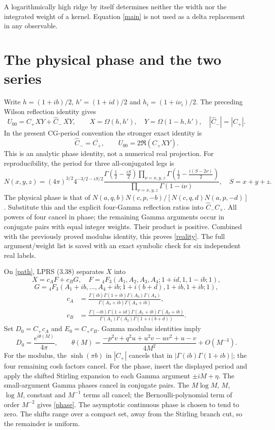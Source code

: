 \documentclass[11pt,a4paper]{article}
\newcommand{\Om}{\Omega}
\begin{document}
A logarithmically high ridge by itself determines neither the width
nor the integrated weight of a kernel. Equation \eqref{main} is not
used as a delta replacement in any observable.

\newpage
\section{The physical phase and the two series}
Write $h=(1+ib)/2$, $h'=(1+id)/2$ and $h_i=(1+i\nu_i)/2$.
The preceding Wilson reflection identity gives
\[
 U_{00}=C_+XY+\widehat C_-\,\overline{XY},\qquad
 X=\Om(h,h'),\quad Y=\Om(1-h,h'),\quad |\widehat C_-|=|C_+|.
\]
In the present CG-period convention the stronger exact identity is
\begin{equation}
 \widehat C_-=\overline{C_+},\qquad U_{00}=2\Re(C_+XY).
 \label{reality}
\end{equation}
This is an analytic phase identity, not a numerical real projection.
For reproducibility, the period for three all-conjugated legs is
\[
 N(x,y,z)=(4\pi)^{3/2}4^{-3/2-iS/2}
 \frac{\Gamma(\frac12-\frac{iS}{2})
       \prod_{\nu=x,y,z}\Gamma(\frac12-\frac{i(S-2\nu)}2)}
      {\prod_{\nu=x,y,z}\Gamma(1-i\nu)},\quad S=x+y+z .
\]
The physical phase is that of
$N(a,q,b)N(c,p,-b)/[N(c,q,d)N(a,p,-d)]$.
Substitute this and the explicit four-Gamma reflection ratios into
$\widehat C_-C_+$. All powers of four cancel in phase; the remaining
Gamma arguments occur in conjugate pairs with equal integer weights.
Their product is positive. Combined with the previously proved modulus
identity, this proves \eqref{reality}. The full argument/weight list is
saved with an exact symbolic check for six independent real labels.

On \eqref{path}, LPRS (3.38) separates $X$ into
\[
 X=c_A F+c_B G,\quad
 F={}_4F_3(A_1,A_2,A_3,A_4;1+id,1,1-ib;1),
\]
\[
 G={}_4F_3(A_1+ib,\ldots,A_4+ib;
                  1+i(b+d),1+ib,1+ib;1),
\]
\begin{align*}
 c_A&=\frac{\Gamma(ib)\Gamma(1+ib)\Gamma(A_3)\Gamma(A_4)}
              {\Gamma(A_3+ib)\Gamma(A_4+ib)},\\
 c_B&=\frac{\Gamma(-ib)\Gamma(1+id)\Gamma(A_1+ib)\Gamma(A_2+ib)}
              {\Gamma(A_1)\Gamma(A_2)\Gamma(1+i(b+d))}.
\end{align*}
Set $D_0=C_+c_A$ and $E_0=C_+c_B$. Gamma modulus identities imply
\begin{equation}
 D_0=\frac{e^{i\theta(M)}}{4\pi},\qquad
 \theta(M)=\frac{-p^2v+q^2u+u^2v-uv^2+u-v}{4M^2}+O(M^{-3}).
 \label{phase}
\end{equation}
For the modulus, the $\sinh(\pi b)$ in $|C_+|$ cancels that in
$|\Gamma(ib)\Gamma(1+ib)|$; the four remaining cosh factors cancel.
For the phase, insert the displayed period and apply the shifted
Stirling expansion to each Gamma argument $\pm iM+\eta$.
The small-argument Gamma phases cancel in conjugate pairs.
The $M\log M$, $M$, $\log M$, constant and $M^{-1}$ terms all cancel;
the Bernoulli-polynomial term of order $M^{-2}$ gives \eqref{phase}.
The asymptotic continuous phase is chosen to tend to zero.
The shifts range over a compact set, away from the Stirling branch cut,
so the remainder is uniform.
\end{document}
